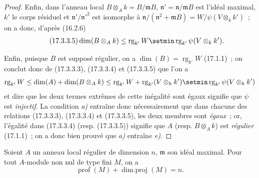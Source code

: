 \begin{proof}
Enfin, dans l'anneau local $B\otimes_A k=B/\mathfrak{m}B$,
$\mathfrak{n}'=\mathfrak{n}/\mathfrak{m}B$ est l'idéal maximal, $k'$ le corps
résiduel et $\mathfrak{n}'/\mathfrak{n}'^2$ est isomorphe à
$\mathfrak{n}/(\mathfrak{n}^2+\mathfrak{m}B)
=W/\psi(V\otimes_k k')$~; on a donc, d'après (16.2.6)
\begin{equation}
\label{0.17.3.3.5-fr}
\tag{17.3.3.5}
  \dim(B\otimes_A k)
  \leq\operatorname{rg}_{k'}W
  \setmin\operatorname{rg}_{k'}\psi(V\otimes_k k').
\end{equation}

Enfin, puisque $B$ est supposé régulier, on a
$\dim(B)=\operatorname{rg}_{k'}W$ (17.1.1)~; on conclut donc de (17.3.3.3),
(17.3.3.4) et (17.3.3.5) que l'on a
\[
  \operatorname{rg}_{k'}W
  \leq\dim(A)+\dim(B\otimes_A k)
  \leq\operatorname{rg}_{k'}W
  +\operatorname{rg}_{k'}(V\otimes_k k')
  \setmin\operatorname{rg}_{k'}\psi(V\otimes_k k')
\]
et dire que les deux termes extrêmes de cette inégalité sont égaux signifie
que $\psi$ est \emph{injectif}. La condition \emph{a)} entraîne donc nécessairement
que dans chacune des relations (17.3.3.3), (17.3.3.4) et (17.3.3.5), les deux
membres sont \emph{égaux}~; or, l'égalité dans (17.3.3.4) (resp. (17.3.3.5))
signifie que $A$ (resp. $B\otimes_A k$) est \emph{régulier} (17.1.1)~; on a
donc bien prouvé que \emph{a)} entraîne \emph{e)}.
\end{proof}

\begin{proposition}[17.3.4]
\label{0.17.3.4-fr}
Soient $A$ un anneau local régulier de dimension $n$, $\mathfrak{m}$ son idéal
maximal. Pour tout $A$-module non nul de type fini $M$, on a
\begin{equation}
\label{0.17.3.4.1-fr}
\tag{17.3.4.1}
  \operatorname{prof}(M)+\operatorname{dim.proj}(M)=n.
\end{equation}
\end{proposition}

